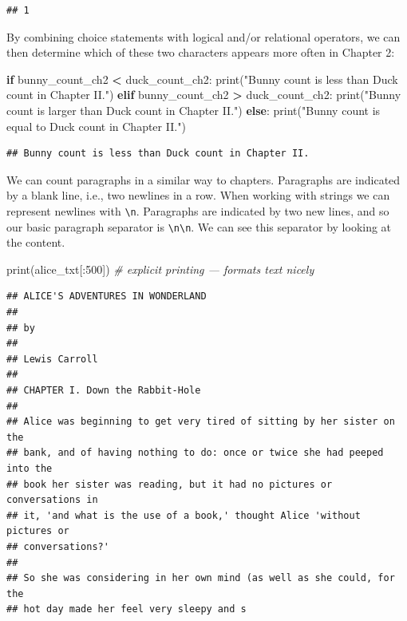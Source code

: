 \documentclass[]{book}
\newenvironment{Shaded}{\begin{snugshade}}{\end{snugshade}}
\newcommand{\BuiltInTok}[1]{#1}
\newcommand{\CommentTok}[1]{\textcolor[rgb]{0.56,0.35,0.01}{\textit{#1}}}
\newcommand{\ControlFlowTok}[1]{\textcolor[rgb]{0.13,0.29,0.53}{\textbf{#1}}}
\newcommand{\DecValTok}[1]{\textcolor[rgb]{0.00,0.00,0.81}{#1}}
\newcommand{\NormalTok}[1]{#1}
\newcommand{\OperatorTok}[1]{\textcolor[rgb]{0.81,0.36,0.00}{\textbf{#1}}}
\newcommand{\StringTok}[1]{\textcolor[rgb]{0.31,0.60,0.02}{#1}}
\begin{document}
\begin{verbatim}
## 1
\end{verbatim}

By combining choice statements with logical and/or relational operators, we can then determine which of these two characters
appears more often in Chapter 2:

\begin{Shaded}
\begin{Highlighting}[]
\ControlFlowTok{if}\NormalTok{ bunny_count_ch2 }\OperatorTok{<}\NormalTok{ duck_count_ch2:}
    \BuiltInTok{print}\NormalTok{(}\StringTok{"Bunny count is less than Duck count in Chapter II."}\NormalTok{)}
\ControlFlowTok{elif}\NormalTok{ bunny_count_ch2 }\OperatorTok{>}\NormalTok{ duck_count_ch2:}
    \BuiltInTok{print}\NormalTok{(}\StringTok{"Bunny count is larger than Duck count in Chapter II."}\NormalTok{)}
\ControlFlowTok{else}\NormalTok{:}
    \BuiltInTok{print}\NormalTok{(}\StringTok{"Bunny count is equal to Duck count in Chapter II."}\NormalTok{)}
\end{Highlighting}
\end{Shaded}

\begin{verbatim}
## Bunny count is less than Duck count in Chapter II.
\end{verbatim}

We can count paragraphs in a similar way to chapters. Paragraphs are indicated by a blank line, i.e., two newlines in a row. When working with strings we can represent newlines with \texttt{\textbackslash{}n}. Paragraphs are indicated by two new lines, and so our basic paragraph separator is \texttt{\textbackslash{}n\textbackslash{}n}. We can see this separator by looking at the content.

\begin{Shaded}
\begin{Highlighting}[]
\BuiltInTok{print}\NormalTok{(alice_txt[:}\DecValTok{500}\NormalTok{]) }\CommentTok{# explicit printing --- formats text nicely}
\end{Highlighting}
\end{Shaded}

\begin{verbatim}
## ﻿ALICE'S ADVENTURES IN WONDERLAND
## 
## by
## 
## Lewis Carroll
## 
## CHAPTER I. Down the Rabbit-Hole
## 
## Alice was beginning to get very tired of sitting by her sister on the
## bank, and of having nothing to do: once or twice she had peeped into the
## book her sister was reading, but it had no pictures or conversations in
## it, 'and what is the use of a book,' thought Alice 'without pictures or
## conversations?'
## 
## So she was considering in her own mind (as well as she could, for the
## hot day made her feel very sleepy and s
\end{verbatim}
\end{document}
